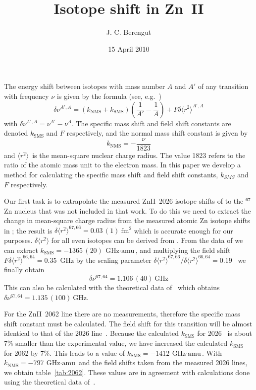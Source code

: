 \documentclass[twocolumn,pra,showpacs]{revtex4}
\newcommand{\Rms}{\ensuremath{\langle r^2 \rangle}}
\newcommand{\GHzamu}{\ensuremath{\textrm{GHz}\cdot\textrm{amu}}}
\newcommand{\GHz}{\textrm{GHz}}
\begin{document}
\title{Isotope shift in Zn~II}

\author{J. C. Berengut}

\date{15 April 2010}

\maketitle

The energy shift between isotopes with mass number $A$ and $A'$ of any transition with frequency $\nu$ is given by the formula (see, e.g.~\cite{berengut03pra})
\begin{equation}
\label{eq:IS}
\delta\nu^{A', A} = \left( k_\textrm{NMS} + k_\textrm{SMS} \right) \left( \frac{1}{A'} - \frac{1}{A} \right) + F \delta\Rms^{A', A}
\end{equation}
with $\delta\nu^{A', A}=\nu^{A'} - \nu^{A}$. The specific mass shift and field shift constants are denoted $k_\textrm{SMS}$ and $F$ respectively, and the normal mass shift constant is given by
\begin{equation}
k_\textrm{NMS} = -\frac{\nu}{1823}
\end{equation}
and \Rms\ is the mean-square nuclear charge radius. The value 1823 refers to the ratio of the atomic mass unit to the electron mass. In this paper we develop a method for calculating the specific mass shift and field shift constants, $k_{SMS}$ and $F$ respectively.

Our first task is to extrapolate the measured ZnII~2026 isotope shifts of \cite{matsubara03apb} to the $^{67}$Zn nucleus that was not included in that work. To do this we need to extract the change in mean-square charge radius from the measured atomic Zn isotope shifts in \cite{campbell97jpb}; the result is $\delta\Rms^{67, 66} = 0.03\,(1)\ \textrm{fm}^2$ which is accurate enough for our purposes. $\delta\Rms$ for all even isotopes can be derived from \cite{angeli04adndt}. From the data of \cite{matsubara03apb} we can extract $k_\textrm{SMS} = -1365\,(20)~\GHzamu$, and multiplying the field shift $F \delta\Rms^{66, 64} = 0.35$~GHz by the scaling parameter $\delta\Rms^{67, 66}/\delta\Rms^{66, 64} = 0.19$~\cite{campbell97jpb} we finally obtain
\[
\delta\nu^{67, 64} = 1.106\,(40)~\GHz
\]
This can also be calculated with the theoretical data of~\cite{berengut03pra} which obtains $\delta\nu^{67, 64} = 1.135\,(100)~\GHz$.

For the ZnII~2062 line there are no measurements, therefore the specific mass shift constant must be calculated. The field shift for this transition will be almost identical to that of the 2026 line~\cite{berengut03pra}. Because the calculated $k_\textrm{SMS}$ for 2026~\cite{berengut03pra} is about 7\% smaller than the experimental value, we have increased the calculated $k_\textrm{SMS}$ for 2062 by 7\%. This leads to a value of $k_\textrm{SMS} = -1412~\GHzamu$. With $k_\textrm{NMS} = -797~\GHzamu$ and the field shifts taken from the measured 2026 lines, we obtain table~\ref{tab:2062}. These values are in agreement with calculations done using the theoretical data of~\cite{berengut03pra}.
\end{document}
